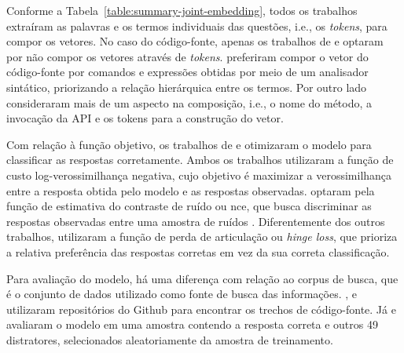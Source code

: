 Conforme a Tabela~\ref{table:summary-joint-embedding}, todos os trabalhos extraíram as palavras e os termos individuais das questões, i.e., os \textit{tokens}, para compor os vetores. No caso do código-fonte, apenas os trabalhos de \cite{Allamanis-bimodal-source-code-natural-language:2015} e \cite{Gu-deep-code-search:2018} optaram por não compor os vetores através de \textit{tokens}. \cite{Allamanis-bimodal-source-code-natural-language:2015} preferiram compor o vetor do código-fonte por comandos e expressões obtidas por meio de um analisador sintático, priorizando a relação hierárquica entre os termos. Por outro lado \cite{Gu-deep-code-search:2018} consideraram mais de um aspecto na composição, i.e., o nome do método, a invocação da API e os tokens para a construção do vetor.


Com relação à função objetivo, os trabalhos de \cite{iyer-etal-2016-summarizing} e \cite{Chen-bi-variational-autoencoder:2018} otimizaram o modelo para classificar as respostas corretamente. Ambos os trabalhos utilizaram a função de custo log-verossimilhança negativa, cujo objetivo é maximizar a verossimilhança entre a resposta obtida pelo modelo e as respostas observadas. \cite{Allamanis-bimodal-source-code-natural-language:2015} optaram pela função de estimativa do contraste de ruído ou \acrlong{nce}, que busca discriminar as respostas observadas entre uma amostra de ruídos \citep{gutmann-nce-noise-contrastive-estimation-2010}. Diferentemente dos outros trabalhos, \cite{Gu-deep-code-search:2018} utilizaram a função de perda de articulação ou \textit{hinge loss}, que prioriza a relativa preferência das respostas corretas em vez da sua correta classificação. 

Para avaliação do modelo, há uma diferença com relação ao corpus de busca, que é o conjunto de dados utilizado como fonte de busca das informações. \cite{Gu-deep-code-search:2018}, \cite{Sachdev-neural-code-search:2018} e \cite{cambronero-deep-learning-code-search:2019} utilizaram repositórios do Github para encontrar os trechos de código-fonte. Já \cite{iyer-etal-2016-summarizing} e \cite{Chen-bi-variational-autoencoder:2018} avaliaram o modelo em uma amostra contendo a resposta correta e outros 49 distratores, selecionados aleatoriamente da amostra de treinamento. 


